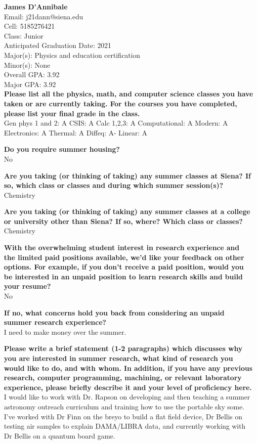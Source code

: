 \documentclass[12pt,preprint]{aastex}
\begin{document}
{\large {\bf James D'Annibale}}\\
Email: j21dann@siena.edu\\
Cell: 5185276421\\
Class: Junior \\
Anticipated Graduation Date: 2021\\
Major(s): Physics and education certification\\
Minor(s): None\\
Overall GPA: 3.92\\
Major GPA: 3.92\\

 \vspace*{1mm}
{\bf Please list all the physics, math, and computer science classes you have taken or are currently taking.  For the courses you have completed, please list your final grade in the class.}\\
Gen phys 1 and 2: A  CSIS: A Calc 1,2,3: A Computational: A Modern: A  Electronics: A Thermal: A Diffeq: A- Linear: A

\vspace*{3mm}
{\bf Do you require summer housing?}\\
No

\vspace*{3mm}
{\bf Are you taking (or thinking of taking) any summer classes at Siena?  If so, which class or classes and during which summer session(s)?}\\
Chemistry 

\vspace*{3mm}
{\bf Are you taking (or thinking of taking) any summer classes at a college or university other than Siena?  If so, where?  Which class or classes?}\\
Chemistry

\vspace*{3mm}
{\bf With the overwhelming student interest in research experience and the limited paid positions available, we'd like your feedback on other options.  For example, if you don't receive a paid position, would you be interested in an unpaid position to learn research skills and build your resume?}\\
No

\vspace*{3mm}
{\bf If no, what concerns hold you back from considering an unpaid summer research experience?}\\
I need to make money over the summer.

\vspace*{3mm}
{\bf Please write a brief statement (1-2 paragraphs) which discusses why you are interested in summer research, what kind of research you would like to do, and with whom.  In addition, if you have any previous research, computer programming, machining, or relevant laboratory experience, please briefly describe it and your level of proficiency here.}\\
I would like to work with Dr. Rapson on developing and then teaching a summer astronomy outreach curriculum and training how to use the portable sky some. I've worked with Dr Finn on the breyo to build a flat field device, Dr Bellis on testing air samples to explain DAMA/LIBRA data, and currently working with Dr Bellis on a quantum board game.
\end{document}
